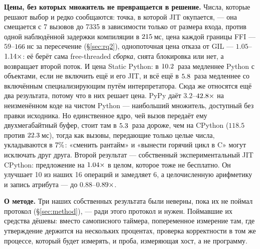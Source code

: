 \textbf{Цены, без которых множитель не превращается в решение.} Числа, которые решают выбор и редко
сообщаются: точка, в которой JIT окупается, --- она смещается с 7 вызовов до 7335 в зависимости
только от размера входа, против одной наблюдённой задержки компиляции в $\meas{fact:b1_breakeven-314:facts.numba_compile_s:ms}{215}$\,мс, цена каждой
границы FFI --- $59$--$\meas{med:b1_compute-314:call_overhead/c_ctypes:ns}{166}$\,нс за пересечение (\S\ref{sec:rq2}), однопоточная цена отказа от GIL ---
$1.05$--$\meas{ratio:b4_threads-ft:single_thread_arith/ft|b4_threads-gil:single_thread_arith/gil}{1.14}\times$: её берёт сама free-threaded \emph{сборка}, снята блокировка или нет, а
возвращает второй поток. И цена Static Python: в $\meas{ratio:b6_static-fork_static:matmul96_int/fork_static/static_interp|b6_static-fork_static:matmul96_int/fork_static/boxed_python}{10.2}$~раза медленнее Python с объектами, если
не включить ещё и его JIT, и всё ещё в $\meas{ratio:b6_static-fork_static_adaptive:matmul96_int/fork_static_adaptive/static_interp|b6_static-fork_static_adaptive:matmul96_int/fork_static_adaptive/boxed_python}{5.8}$~раза медленнее со включённым специализирующим путём
интерпретатора. Сюда же относятся ещё два результата, потому
что в них решает цена. PyPy даёт $3.2$--$\meas{ratio:b1_compute-314:matmul/cpython_loop|b1_compute-pypy311:matmul/cpython_loop}{42.8}\times$ на неизменённом коде на чистом Python ---
наибольший множитель, доступный без правки исходника. Но единственное ядро, чей вызов
 передаёт ему двухмегабайтный буфер, стоит там в $\meas{ratio:b2_branchy-pypy311:tokenize/c_ctypes|b2_branchy-314:tokenize/c_ctypes}{5.3}$~раза дороже, чем на CPython
($118.5$ против $\meas{med:b2_branchy-314:tokenize/c_ctypes:ms}{22.3}$\,мс), тогда как вызовы, передающие только целые числа, укладываются
в $\meas{pct:b2_branchy-314:binarytrees/rust_ctypes|b2_branchy-pypy311:binarytrees/rust_ctypes}{7}\%$: «сменить рантайм» и «вынести горячий цикл в C» могут исключать друг друга.
Второй результат --- собственный экспериментальный JIT CPython: предложение на $\meas{geomean:b5_buildcfg-plain|b5_buildcfg-jit}{1.04}\times$ в целом,
которое тоже не бесплатно. Он улучшает 10 из наших 16 операций и замедляет 6, а целочисленную
арифметику и запись атрибута --- до $0.88$--$\meas{ratio:b5_buildcfg-plain:int_arith/plain|b5_buildcfg-jit:int_arith/jit}{0.89}\times$.

\textbf{О методе.} Три наших собственных результата были неверны, пока их не поймал протокол
(\S\ref{sec:method}), --- ради этого протокол и нужен. Поймавшие их средства дёшевы:
 вместо самописного таймера, попеременное измерение там, где утверждение держится на
нескольких процентах, проверка корректности в том же процессе, который будет измерять, и проба,
измеряющая хост, а не программу.

